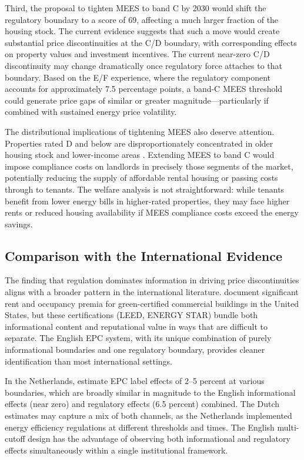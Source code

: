 \documentclass[12pt]{article}
\begin{document}
Third, the proposal to tighten MEES to band C by 2030 would shift the regulatory boundary to a score of 69, affecting a much larger fraction of the housing stock. The current evidence suggests that such a move would create substantial price discontinuities at the C/D boundary, with corresponding effects on property values and investment incentives. The current near-zero C/D discontinuity may change dramatically once regulatory force attaches to that boundary. Based on the E/F experience, where the regulatory component accounts for approximately 7.5 percentage points, a band-C MEES threshold could generate price gaps of similar or greater magnitude---particularly if combined with sustained energy price volatility.

The distributional implications of tightening MEES also deserve attention. Properties rated D and below are disproportionately concentrated in older housing stock and lower-income areas \citep{dietz2020economic}. Extending MEES to band C would impose compliance costs on landlords in precisely those segments of the market, potentially reducing the supply of affordable rental housing or passing costs through to tenants. The welfare analysis is not straightforward: while tenants benefit from lower energy bills in higher-rated properties, they may face higher rents or reduced housing availability if MEES compliance costs exceed the energy savings.

\subsection{Comparison with the International Evidence}

The finding that regulation dominates information in driving price discontinuities aligns with a broader pattern in the international literature. \citet{eichholtz2010doing} document significant rent and occupancy premia for green-certified commercial buildings in the United States, but these certifications (LEED, ENERGY STAR) bundle both informational content and reputational value in ways that are difficult to separate. The English EPC system, with its unique combination of purely informational boundaries and one regulatory boundary, provides cleaner identification than most international settings.

In the Netherlands, \citet{aydin2020capitalization} estimate EPC label effects of 2--5 percent at various boundaries, which are broadly similar in magnitude to the English informational effects (near zero) and regulatory effects (6.5 percent) combined. The Dutch estimates may capture a mix of both channels, as the Netherlands implemented energy efficiency regulations at different thresholds and times. The English multi-cutoff design has the advantage of observing both informational and regulatory effects simultaneously within a single institutional framework.
\end{document}
